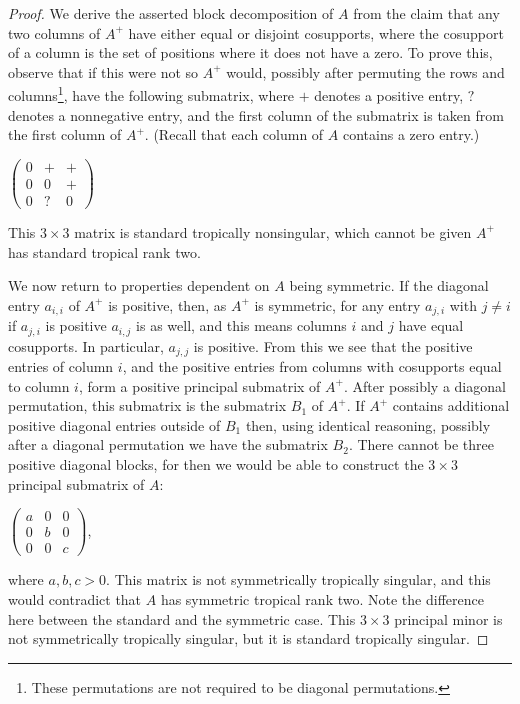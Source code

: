 \documentclass{article}
\begin{document}
\begin{proof}
  We derive the asserted block decomposition of $A$ from the claim that any two columns of $A^{+}$ have either equal or disjoint cosupports, where the cosupport of a column is the set of positions where it does not have a zero. To prove this, observe that if this were not so $A^{+}$ would, possibly after permuting the rows and columns\footnote{These permutations are not required to be diagonal permutations.}, have the following submatrix, where $+$ denotes a positive entry, $?$ denotes a nonnegative entry, and the first column of the submatrix is taken from the first column of $A^{+}$. (Recall that each column of $A$ contains a zero entry.)

  \begin{center}

    $\left(\begin{array}{ccc} 0 & + & + \\ 0 & 0 & + \\ 0 & ? & 0 \end{array}\right)$

  \end{center}

  This $3 \times 3$ matrix is standard tropically nonsingular, which cannot be given $A^{+}$ has standard tropical rank two.

  We now return to properties dependent on $A$ being symmetric. If the diagonal entry $a_{i,i}$ of $A^{+}$ is positive, then, as $A^{+}$ is symmetric, for any entry $a_{j,i}$ with $j \neq i$ if $a_{j,i}$ is positive $a_{i,j}$ is as well, and this means columns $i$ and $j$ have equal cosupports. In particular, $a_{j,j}$ is positive. From this we see that the positive entries of column $i$, and the positive entries from columns with cosupports equal to column $i$, form a positive principal submatrix of $A^{+}$. After possibly a diagonal permutation, this submatrix is the submatrix $B_{1}$ of $A^{+}$. If $A^{+}$ contains additional positive diagonal entries outside of $B_{1}$ then, using identical reasoning, possibly after a diagonal permutation we have the submatrix $B_{2}$. There cannot be three positive diagonal blocks, for then we would be able to construct the $3 \times 3$ principal submatrix of $A$:
  \begin{center}
    $\left(\begin{array}{ccc} a & 0 & 0 \\ 0 & b & 0 \\ 0 & 0 & c \end{array}\right)$,
  \end{center}
  where $a,b,c > 0$. This matrix is not symmetrically tropically singular, and this would contradict that $A$ has symmetric tropical rank two. Note the difference here between the standard and the symmetric case. This $3 \times 3$ principal minor is not symmetrically tropically singular, but it is standard tropically singular. 


\end{proof}
\end{document}
